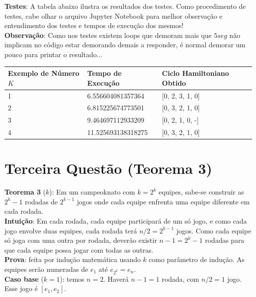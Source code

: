 \documentclass{article}
\begin{document}
\pagebreak

\textbf{Testes}: A tabela abaixo ilustra os resultados dos testes. Como procedimento de testes, cabe olhar o arquivo Jupyter Notebook para melhor observação e entendimento dos testes e tempos de execução dos mesmos!\\

\textbf{Observação}: Como nos testes existem loops que demoram mais que $5 seg$ não implicam no código estar demorando demais a responder, é normal demorar um pouco para printar o resultado...

\begin{table}[H]
\centering
\begin{tabular}{l|l|l}
Exemplo de Número $K$ & Tempo de Execução & Ciclo Hamiltoniano Obtido\\\hline
1 & 6.556604081357364 & [0, 2, 3, 1, 0]\\
2 & 6.815225674773501 & [0, 3, 2, 1, 0]\\
3 & 9.464697112933209 & [0, 2, 1, 0, -]\\
4 & 11.525693138318275 & [0, 3, 2, 1, 0]\\
\end{tabular}
\end{table}

\section{Terceira Questão (Teorema 3)}

\textbf{Teorema 3} ($k$): Em um campeoknato com $k = 2^k$ equipes, sabe-se construir as $2^k - 1$ rodadas de $2^{k - 1}$ jogos onde cada equipe enfrenta uma equipe diferente em cada rodada.\\

\textbf{Intuição}: Em cada rodada, cada equipe participará de um só jogo, e como cada jogo envolve duas equipes, cada rodada terá $n/2 = 2^{k-1}$ jogos. Como cada equipe só joga com uma outra por rodada, deverão existir $n-1 = 2^k -1$ rodadas para que cada equipe possa jogar com todas as outras.\\

\textbf{Prova}: feita por indução matemática usando $k$ como parâmetro de indução. As equipes serão numeradas de $e_1$ até $e_{2^k} = e_n$.\\

\textbf{Caso base} ($k = 1$): temos $n = 2$. Haverá $n-1 = 1$ rodada, com $n/2 = 1$ jogo. Esse jogo é $[e_1, e_2]$.\\
\end{document}
